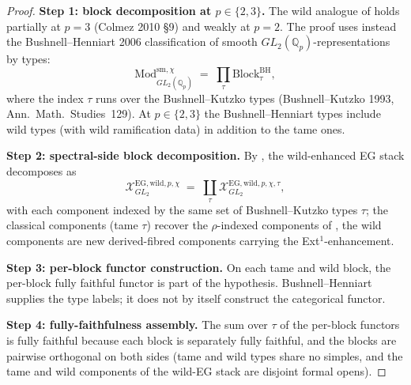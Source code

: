 \begin{proof}
\textbf{Step 1: block decomposition at \(p\in\{2,3\}\).} The wild
analogue of 
holds partially at \(p=3\) (Colmez 2010 \S 9) and weakly at \(p=2\).
The proof uses instead the Bushnell--Henniart 2006 classification of
smooth \(GL_{2}(\mathbb{Q}_{p})\)-representations by types:
\begin{equation}
\mathrm{Mod}_{GL_{2}(\mathbb{Q}_{p})}^{\mathrm{sm},\chi}
\;=\;\prod_{\tau}\mathrm{Block}^{\mathrm{BH}}_{\tau},
\end{equation}
where the index \(\tau\) runs over the Bushnell--Kutzko types
(Bushnell--Kutzko 1993, Ann.~Math.~Studies~129). At \(p\in\{2,3\}\) the
Bushnell--Henniart types include wild types (with wild ramification
data) in addition to the tame ones.

\textbf{Step 2: spectral-side block decomposition.} By
, the wild-enhanced
EG stack decomposes as
\begin{equation}
\mathcal{X}^{\mathrm{EG,wild},p,\chi}_{GL_{2}}\;=\;\coprod_{\tau}\mathcal{X}^{\mathrm{EG,wild},p,\chi,\tau}_{GL_{2}},
\end{equation}
with each component indexed by the same set of Bushnell--Kutzko
types \(\tau\); the classical components (tame \(\tau\)) recover the
\(\rho\)-indexed components of
, the wild components
are new derived-fibred components carrying the Ext\({}^{1}\)-enhancement.

\textbf{Step 3: per-block functor construction.} On each tame
and wild block, the per-block fully faithful functor is part of the
hypothesis.  Bushnell--Henniart supplies the type labels; it does not
by itself construct the categorical functor.

\textbf{Step 4: fully-faithfulness assembly.} The sum over \(\tau\)
of the per-block functors is fully faithful because each block is
separately fully faithful, and the blocks are pairwise orthogonal
on both sides (tame and wild types share no simples, and the
tame and wild components of the wild-EG stack are disjoint
formal opens).
\end{proof}

